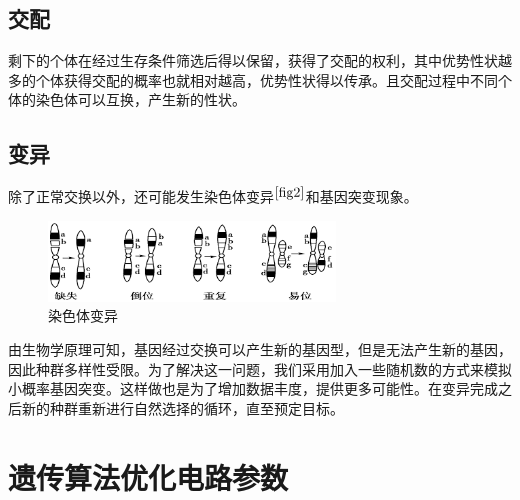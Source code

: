 \documentclass[14pt, a4paper]{article}
\begin{document}
    \subsection{交配}
        剩下的个体在经过生存条件筛选后得以保留，获得了交配的权利，其中优势性状越多的个体获得交配的概率也就相对越高，优势性状得以传承。且交配过程中不同个体的染色体可以互换，产生新的性状。
    \subsection{变异}
        除了正常交换以外，还可能发生染色体变异$^{\ref{fig2}}$和基因突变现象。 
        \begin{figure}[htbp]
            \centering
            \includegraphics[width = 3in]{fig/染色体变异.png}
            \caption{染色体变异}
            \label{fig2}
        \end{figure}
    
        由生物学原理可知，基因经过交换可以产生新的基因型，但是无法产生新的基因，因此种群多样性受限。为了解决这一问题，我们采用加入一些随机数的方式来模拟小概率基因突变。这样做也是为了增加数据丰度，提供更多可能性。在变异完成之后新的种群重新进行自然选择的循环，直至预定目标。

\section{遗传算法优化电路参数}
\end{document}
